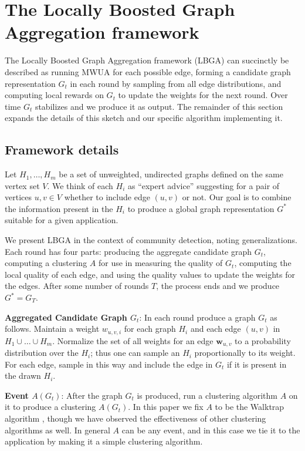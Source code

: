 \documentclass{IEEEtran}
\begin{document}
\section{The Locally Boosted Graph Aggregation framework}
\label{sec:lbga}

The Locally Boosted Graph Aggregation framework (LBGA) can succinctly be
described as running MWUA for each possible edge, forming a candidate graph
representation $G_t$ in each round by sampling from all edge distributions, and
computing local rewards on $G_t$ to update the weights for the next round. Over
time $G_t$ stabilizes and we produce it as output. The remainder of this
section expands the details of this sketch and our specific algorithm
implementing it.  

\subsection{Framework details}
\label{sec:framework}

Let $H_1, \dots, H_m$ be a set of unweighted, undirected graphs defined on the
same vertex set $V$. We think of each $H_i$ as ``expert advice'' suggesting for
a pair of vertices $u,v \in V$ whether to include edge $(u,v)$ or not. Our goal
is to combine the information present in the $H_i$ to produce a global graph
representation $G^*$ suitable for a given application. 

We present LBGA in the context of community detection, noting generalizations.
Each round has four parts: producing the aggregate candidate graph $G_t$,
computing a clustering $A$ for use in measuring the quality of $G_t$, computing
the local quality of each edge, and using the quality values to update the
weights for the edges. After some number of rounds $T$, the process ends and we
produce $G^* = G_T$.

\textbf{Aggregated Candidate Graph $G_t$}: In each round produce a graph $G_t$
as follows. Maintain a weight $w_{u,v,i}$ for each graph $H_i$ and each edge
$(u,v)$ in $H_1 \cup \dots \cup H_m$. Normalize the set of all weights for an
edge $\mathbf{w}_{u,v}$ to a probability distribution over the $H_i$; thus one
can sample an $H_i$ proportionally to its weight. For each edge, sample in this
way and include the edge in $G_t$ if it is present in the drawn $H_i$. 

\textbf{Event $A(G_t)$}: After the graph $G_t$ is produced, run a clustering
algorithm $A$ on it to produce a clustering $A(G_t)$. In this paper we fix $A$
to be the Walktrap algorithm \cite{Walktrap}, though we have observed the
effectiveness of other clustering algorithms as well. In general $A$ can be any
event, and in this case we tie it to the application by making it a simple
clustering algorithm.
\end{document}
